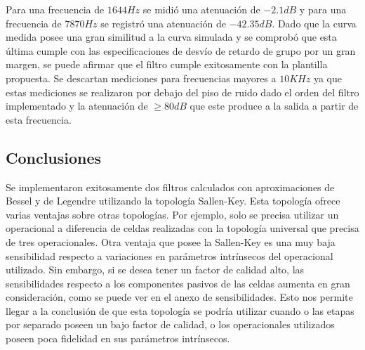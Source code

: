 Para una frecuencia de $1644Hz$ se midió una atenuación de $-2.1dB$ y para una frecuencia de $7870Hz$ se registró una atenuación de $-42.35dB$. Dado que la curva medida posee una gran similitud a la curva simulada y se comprobó que esta última cumple con las especificaciones de desvío de retardo de grupo por un gran margen, se puede afirmar que el filtro cumple exitosamente con la plantilla propuesta. Se descartan mediciones para frecuencias mayores a $10KHz$ ya que estas mediciones se realizaron por debajo del piso de ruido dado el orden del filtro implementado y la atenuación de $\geq 80dB$ que este produce a la salida a partir de esta frecuencia.

\subsection{Conclusiones}

Se implementaron exitosamente dos filtros calculados con aproximaciones de Bessel y de Legendre utilizando la topología Sallen-Key. Esta topología ofrece varias ventajas sobre otras topologías. Por ejemplo, solo se precisa utilizar un operacional a diferencia de celdas realizadas con la topología universal que precisa de tres operacionales. Otra ventaja que posee la Sallen-Key es una muy baja sensibilidad respecto a variaciones en parámetros intrínsecos del operacional utilizado. Sin embargo, si se desea tener un factor de calidad alto, las sensibilidades respecto a los componentes pasivos de las celdas aumenta en gran consideración, como se puede ver en el anexo de sensibilidades. Esto nos permite llegar a la conclusión de que esta topología se podría utilizar cuando o las etapas por separado poseen un bajo factor de calidad, o los operacionales utilizados poseen poca fidelidad en sus parámetros intrínsecos.